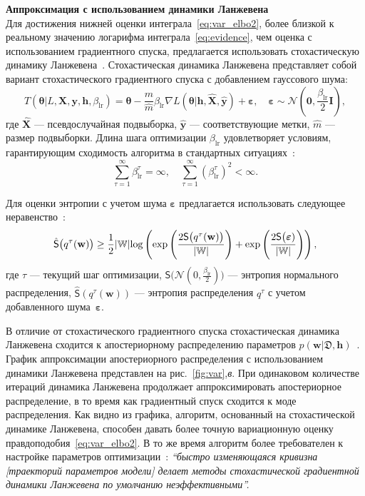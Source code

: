\textbf{Аппроксимация с использованием динамики Ланжевена}\\
Для достижения нижней оценки интеграла~\eqref{eq:var_elbo2}, более близкой к реальному значению логарифма интеграла~\eqref{eq:evidence}, чем оценка с использованием градиентного спуска, предлагается использовать стохастическую динамику Ланжевена~\cite{langevin}. Стохастическая динамика Ланжевена представляет собой вариант стохастического градиентного спуска с добавлением гауссового шума:
\begin{equation}
\label{eq:langevin}
	T( \boldsymbol{\theta}| L,\mathbf{X},  \mathbf{y},  \mathbf{h}, {\beta_{\text{lr}}}) = \boldsymbol{\theta} -\frac{m}{\hat{m}}  \beta_{\text{lr}} \nabla L(\boldsymbol{\theta}| \mathbf{h}, \hat{\mathbf{X}}, \hat{\mathbf{y}})  + \boldsymbol{\varepsilon}, \quad  \boldsymbol{\varepsilon} \sim \mathcal{N}(\mathbf{0}, {\frac{\beta_{\text{lr}}}{2}}\mathbf{I}),
\end{equation}
где $\hat{\mathbf{X}}$ --- псевдослучайная подвыборка, $\hat{\mathbf{y}}$ --- соответствующие метки, $\hat{m}$ --- размер подвыборки. Длина шага оптимизации $\beta_{\text{lr}}$ удовлетворяет  {условиям, гарантирующим сходимость алгоритма в стандартных ситуациях~\cite{langevin}}:
\[
	\sum_{\tau=1}^\infty \beta_{\text{lr}}^\tau = \infty, \quad \sum_{\tau=1}^\infty (\beta_{\text{lr}}^\tau)^2 < \infty.
\]

Для оценки энтропии с учетом шума $\boldsymbol{\varepsilon}$ предлагается использовать следующее неравенство~\cite{entropy,var_grad}:
\[
\hat{\mathsf{S}}\bigl(q^\tau(\mathbf{w})\bigr)   \geq \frac{1}{2}|\mathbb{W}|\textnormal{log}\left(\textnormal{exp}\left(\frac{2\mathsf{S}\bigl(q^\tau(\mathbf{w})\bigr)}{|\mathbb{W}|}\right) + \textnormal{exp}\left(\frac{2\mathsf{S}\bigl( \boldsymbol{\varepsilon})}{|\mathbb{W}|}\right)\right),
\]
{где  $\tau$ --- текущий шаг оптимизации,} $\mathsf{S}\bigl( \mathcal{N}({0}, {\frac{\beta_{\text{lr}}}{2}})\bigr)$ --- энтропия нормального распределения, $\hat{\mathsf{S}}(q^\tau(\mathbf{w}))$ --- энтропия распределения $q^\tau$ с учетом добавленного шума~$\boldsymbol{\varepsilon}$.


В отличие от стохастического градиентного спуска стохастическая динамика Ланжевена сходится к апостериорному распределению параметров $p(\mathbf{w}|\mathfrak{D},\mathbf{h})$~\cite{langevin, langevin_sato}.  График аппроксимации апостериорного распределения с использованием динамики Ланжевена представлен на рис.~\ref{fig:var},\textit{в}. При одинаковом количестве итераций динамика Ланжевена продолжает аппроксимировать апостериорное распределение, в то время как градиентный спуск сходится к моде распределения. {Как видно из графика, алгоритм, основанный на стохастической динамике Ланжевена, способен давать более точную вариационную оценку правдоподобия~\eqref{eq:var_elbo2}. В то же время алгоритм более требователен к настройке параметров оптимизации~\cite{sgld}: \textit{``быстро изменяющаяся кривизна [траекторий параметров модели] делает методы стохастической градиентной динамики Ланжевена по умолчанию неэффективными''.}}




